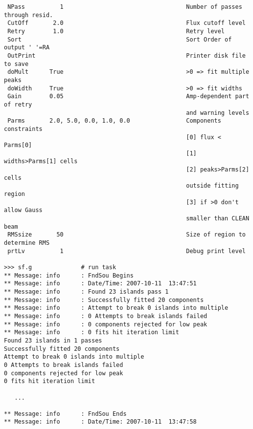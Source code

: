 \documentclass[11pt]{report}
\begin{document}
\begin{verbatim}
 NPass          1                                   Number of passes through resid.
 CutOff       2.0                                   Flux cutoff level
 Retry        1.0                                   Retry level
 Sort                                               Sort Order of output ' '=RA
 OutPrint                                           Printer disk file to save
 doMult      True                                   >0 => fit multiple peaks
 doWidth     True                                   >0 => fit widths
 Gain        0.05                                   Amp-dependent part of retry
                                                    and warning levels
 Parms       2.0, 5.0, 0.0, 1.0, 0.0                Components constraints
                                                    [0] flux < Parms[0]
                                                    [1] widths>Parms[1] cells
                                                    [2] peaks>Parms[2] cells
                                                    outside fitting region
                                                    [3] if >0 don't allow Gauss
                                                    smaller than CLEAN beam
 RMSsize       50                                   Size of region to determine RMS
 prtLv          1                                   Debug print level

>>> sf.g              # run task 
** Message: info      : FndSou Begins
** Message: info      : Date/Time: 2007-10-11  13:47:51
** Message: info      : Found 23 islands pass 1
** Message: info      : Successfully fitted 20 components
** Message: info      : Attempt to break 0 islands into multiple
** Message: info      : 0 Attempts to break islands failed
** Message: info      : 0 components rejected for low peak
** Message: info      : 0 fits hit iteration limit
Found 23 islands in 1 passes
Successfully fitted 20 components
Attempt to break 0 islands into multiple
0 Attempts to break islands failed
0 components rejected for low peak
0 fits hit iteration limit

   ...

** Message: info      : FndSou Ends
** Message: info      : Date/Time: 2007-10-11  13:47:58
\end{verbatim}
\end{document}
